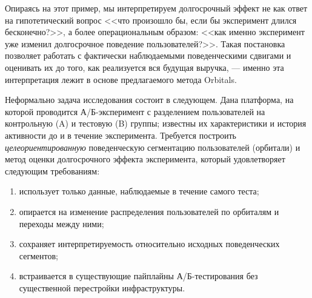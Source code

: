 Опираясь на этот пример, мы интерпретируем долгосрочный эффект не как ответ
на гипотетический вопрос <<что произошло бы, если бы эксперимент длился
бесконечно?>>, а более операциональным образом: <<как именно эксперимент
уже изменил долгосрочное поведение пользователей?>>. Такая постановка
позволяет работать с фактически наблюдаемыми поведенческими сдвигами и
оценивать их до того, как реализуется вся будущая выручка, --- именно эта
интерпретация лежит в основе предлагаемого метода Orbitals.

Неформально задача исследования состоит в следующем. Дана платформа,
на которой проводится А/Б-эксперимент с разделением пользователей на
контрольную (A) и тестовую (B) группы; известны их характеристики и
история активности до и в течение эксперимента. Требуется построить
\textit{целеориентированную} поведенческую сегментацию пользователей
(орбитали) и метод оценки долгосрочного эффекта эксперимента, который
удовлетворяет следующим требованиям:
\begin{enumerate}[label=(\roman*),leftmargin=*,itemsep=2pt]
  \item использует только данные, наблюдаемые в течение самого теста;
  \item опирается на изменение распределения пользователей по орбиталям
        и переходы между ними;
  \item сохраняет интерпретируемость относительно исходных поведенческих
        сегментов;
  \item встраивается в существующие пайплайны А/Б-тестирования без
        существенной перестройки инфраструктуры.
\end{enumerate}

